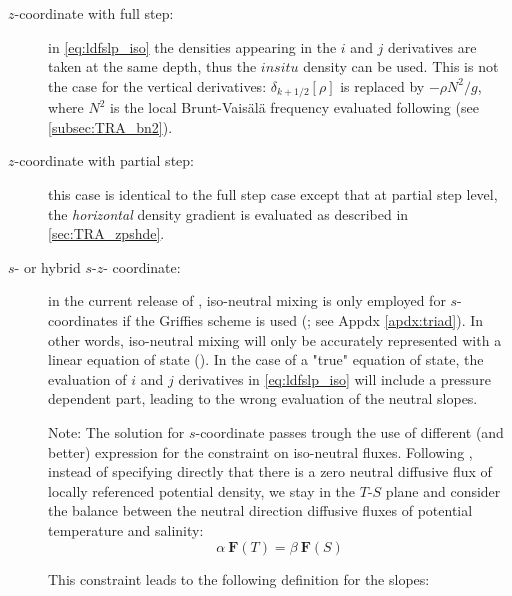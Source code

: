 \documentclass[../main/NEMO_manual]{subfiles}
\begin{document}
\begin{description}

\item[$z$-coordinate with full step: ]
  in \autoref{eq:ldfslp_iso} the densities appearing in the $i$ and $j$ derivatives  are taken at the same depth,
  thus the $in situ$ density can be used.
  This is not the case for the vertical derivatives: $\delta_{k+1/2}[\rho]$ is replaced by $-\rho N^2/g$,
  where $N^2$ is the local Brunt-Vais\"{a}l\"{a} frequency evaluated following \citet{McDougall1987}
  (see \autoref{subsec:TRA_bn2}). 

\item[$z$-coordinate with partial step: ]
  this case is identical to the full step case except that at partial step level,
  the \emph{horizontal} density gradient is evaluated as described in \autoref{sec:TRA_zpshde}.

\item[$s$- or hybrid $s$-$z$- coordinate: ]
  in the current release of \NEMO, iso-neutral mixing is only employed for $s$-coordinates if
  the Griffies scheme is used (;
  see Appdx \autoref{apdx:triad}).
  In other words, iso-neutral mixing will only be accurately represented with a linear equation of state
  ().
  In the case of a "true" equation of state, the evaluation of $i$ and $j$ derivatives in \autoref{eq:ldfslp_iso}
  will include a pressure dependent part, leading to the wrong evaluation of the neutral slopes.

  Note: The solution for $s$-coordinate passes trough the use of different (and better) expression for
  the constraint on iso-neutral fluxes.
  Following \citet{Griffies_Bk04}, instead of specifying directly that there is a zero neutral diffusive flux of
  locally referenced potential density, we stay in the $T$-$S$ plane and consider the balance between
  the neutral direction diffusive fluxes of potential temperature and salinity:
  \[
    \alpha \ \textbf{F}(T) = \beta \ \textbf{F}(S)
  \]

This constraint leads to the following definition for the slopes:


\end{description}
\end{document}
